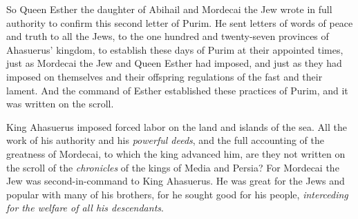 \begin{biblechapter}
\verse So Queen Esther the daughter of Abihail and Mordecai the Jew wrote in full authority to confirm this second letter of Purim.
\verse He sent letters of words of peace and truth to all the Jews, to the one hundred and twenty-seven provinces of Ahasuerus’ kingdom,
\verse to establish these days of Purim at their appointed times, just as Mordecai the Jew and Queen Esther had imposed, and just as they had imposed on themselves and their offspring regulations of the fast and their lament.
\verse And the command of Esther established these practices of Purim, and it was written on the scroll.
\end{biblechapter}

\begin{biblechapter} %
 King Ahasuerus imposed forced labor on the land and islands of the sea.
\verse All the work of his authority and his \textit{powerful deeds}, and the full accounting of the greatness of Mordecai, to which the king advanced him, are they not written on the scroll of the \textit{chronicles} of the kings of Media and Persia?
\verse For Mordecai the Jew was second-in-command to King Ahasuerus. He was great for the Jews and popular with many of his brothers, for he sought good for his people, \textit{interceding for the welfare of all his descendants}.
\end{biblechapter}

